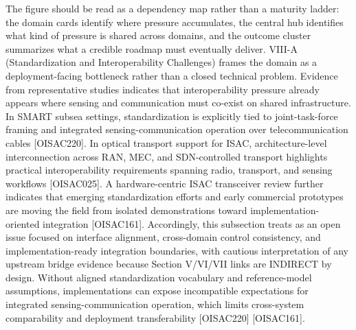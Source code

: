 {}The figure should be read as a dependency map rather than a maturity ladder: the domain cards identify where pressure accumulates, the central hub identifies what kind of pressure is shared across domains, and the outcome cluster summarizes what a credible roadmap must eventually deliver.\markdownRendererInterblockSeparator
{}\markdownRendererSectionBegin
{}\markdownRendererInterblockSeparator
{}\markdownRendererSectionBegin
{}\markdownRendererInterblockSeparator
{}VIII-A (Standardization and Interoperability Challenges) frames the  domain as a deployment-facing bottleneck rather than a closed technical problem. Evidence from representative studies indicates that interoperability pressure already appears where sensing and communication must co-exist on shared infrastructure. In SMART subsea settings, standardization is explicitly tied to joint-task-force framing and integrated sensing-communication operation over telecommunication cables [O\markdownRendererUnderscore{}ISAC\markdownRendererUnderscore{}220]. In optical transport support for ISAC, architecture-level interconnection across RAN, MEC, and SDN-controlled transport highlights practical interoperability requirements spanning radio, transport, and sensing workflows [O\markdownRendererUnderscore{}ISAC\markdownRendererUnderscore{}025]. A hardware-centric ISAC transceiver review further indicates that emerging standardization efforts and early commercial prototypes are moving the field from isolated demonstrations toward implementation-oriented integration [O\markdownRendererUnderscore{}ISAC\markdownRendererUnderscore{}161]. Accordingly, this subsection treats  as an open issue focused on interface alignment, cross-domain control consistency, and implementation-ready integration boundaries, with cautious interpretation of any upstream bridge evidence because Section V/VI/VII links are INDIRECT by design.\markdownRendererInterblockSeparator
{}
\markdownRendererSectionEnd \markdownRendererSectionBegin
{}\markdownRendererInterblockSeparator
{} Without aligned standardization vocabulary and reference-model assumptions, implementations can expose incompatible expectations for integrated sensing-communication operation, which limits cross-system comparability and deployment transferability [O\markdownRendererUnderscore{}ISAC\markdownRendererUnderscore{}220] [O\markdownRendererUnderscore{}ISAC\markdownRendererUnderscore{}161].\markdownRendererParagraphSeparator
